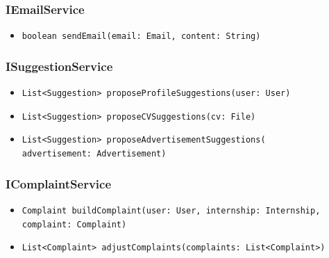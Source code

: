 \subsubsection{IEmailService}
\begin{itemize}
    \item \verb|boolean sendEmail(email: Email, content: String)|
\end{itemize}

\subsubsection{ISuggestionService}
\begin{itemize}
    \item \verb|List<Suggestion> proposeProfileSuggestions(user: User)|
    \item \verb|List<Suggestion> proposeCVSuggestions(cv: File)|
    \item \verb|List<Suggestion> proposeAdvertisementSuggestions(| \\ \makebox[10em][l]{} \verb|advertisement: Advertisement)|
\end{itemize}

\subsubsection{IComplaintService}
\begin{itemize}
    \item \verb|Complaint buildComplaint(user: User, internship: Internship, | \\ \makebox[10em][l]{} \verb|complaint: Complaint)|
    \item \verb|List<Complaint> adjustComplaints(complaints: List<Complaint>)|
\end{itemize}

